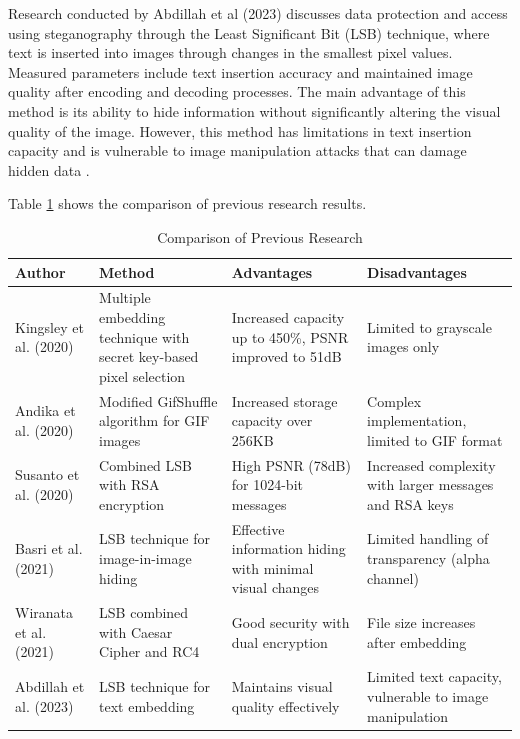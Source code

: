 \documentclass{ittelkom}
\begin{document}
Research conducted by Abdillah et al (2023) discusses data protection and
access using steganography through the Least Significant Bit (LSB) technique,
where text is inserted into images through changes in the smallest pixel
values. Measured parameters include text insertion accuracy and maintained
image quality after encoding and decoding processes. The main advantage of this
method is its ability to hide information without significantly altering the
visual quality of the image. However, this method has limitations in text
insertion capacity and is vulnerable to image manipulation attacks that can
damage hidden data \cite{abdillah2023implementasi}.

Table \ref{tab:comparison} shows the comparison of previous research results.

\begin{table}[h!]
    \caption{Comparison of Previous Research}
    \begin{tabularx}{\textwidth}{|p{2cm}|X|p{2.5cm}|p{2.5cm}|}
        \hline
        \textbf{Author}        & \textbf{Method}                                                    & \textbf{Advantages}                                      & \textbf{Disadvantages}                                  \\
        \hline
        Kingsley et al. (2020) & Multiple embedding technique with secret key-based pixel selection & Increased capacity up to 450\%, PSNR improved to 51dB    & Limited to grayscale images only                        \\
        \hline
        Andika et al. (2020)   & Modified GifShuffle algorithm for GIF images                       & Increased storage capacity over 256KB                    & Complex implementation, limited to GIF format           \\
        \hline
        Susanto et al. (2020)  & Combined LSB with RSA encryption                                   & High PSNR (78dB) for 1024-bit messages                   & Increased complexity with larger messages and RSA keys  \\
        \hline
        Basri et al. (2021)    & LSB technique for image-in-image hiding                            & Effective information hiding with minimal visual changes & Limited handling of transparency (alpha channel)        \\
        \hline
        Wiranata et al. (2021) & LSB combined with Caesar Cipher and RC4                            & Good security with dual encryption                       & File size increases after embedding                     \\
        \hline
        Abdillah et al. (2023) & LSB technique for text embedding                                   & Maintains visual quality effectively                     & Limited text capacity, vulnerable to image manipulation \\
        \hline
    \end{tabularx}
    \label{tab:comparison}
\end{table}
\end{document}
